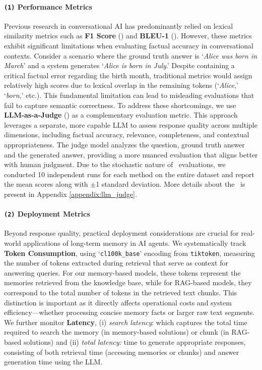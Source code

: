 \paragraph{\texttt{(1)} Performance Metrics}
Previous research in conversational AI \citep{goswami2025dissecting, soni2024evaluating, singh2020ensemble} has predominantly relied on lexical similarity metrics such as \textbf{F1 Score} (\Fone) and \textbf{BLEU-1} (\Bone). However, these metrics exhibit significant limitations when evaluating factual accuracy in conversational contexts. Consider a scenario where the ground truth answer is `\textit{Alice was born in March}' and a system generates `\textit{Alice is born in July}.' Despite containing a critical factual error regarding the birth month, traditional metrics would assign relatively high scores due to lexical overlap in the remaining tokens (`\textit{Alice},' `\textit{born},' etc.). This fundamental limitation can lead to misleading evaluations that fail to capture semantic correctness.
To address these shortcomings, we use \textbf{LLM-as-a-Judge} (\Judge) as a complementary evaluation metric. This approach leverages a separate, more capable LLM to assess response quality across multiple dimensions, including factual accuracy, relevance, completeness, and contextual appropriateness. The judge model analyzes the question, ground truth answer and the generated answer, providing a more nuanced evaluation that aligns better with human judgment. Due to the stochastic nature of \Judge~evaluations, we conducted 10 independent runs for each method on the entire dataset and report the mean scores along with $\pm$1 standard deviation. More details about the \Judge~is present in Appendix \ref{appendix:llm_judge}.

\paragraph{\texttt{(2)} Deployment Metrics}
Beyond response quality, practical deployment considerations are crucial for real-world applications of long-term memory in AI agents. We systematically track \textbf{Token Consumption}, using `\texttt{cl100k\_base}' encoding from \texttt{tiktoken}, measuring the number of tokens extracted during retrieval that serve as context for answering queries. For our memory-based models, these tokens represent the memories retrieved from the knowledge base, while for RAG-based models, they correspond to the total number of tokens in the retrieved text chunks. This distinction is important as it directly affects operational costs and system efficiency—whether processing concise memory facts or larger raw text segments. We further monitor \textbf{Latency}, (i) \emph{search latency}: which captures the total time required to search the memory (in memory-based solutions) or chunk (in RAG-based solutions) and (ii) \emph{total latency:} time to generate appropriate responses, consisting of both retrieval time (accessing memories or chunks) and answer generation time using the LLM.

